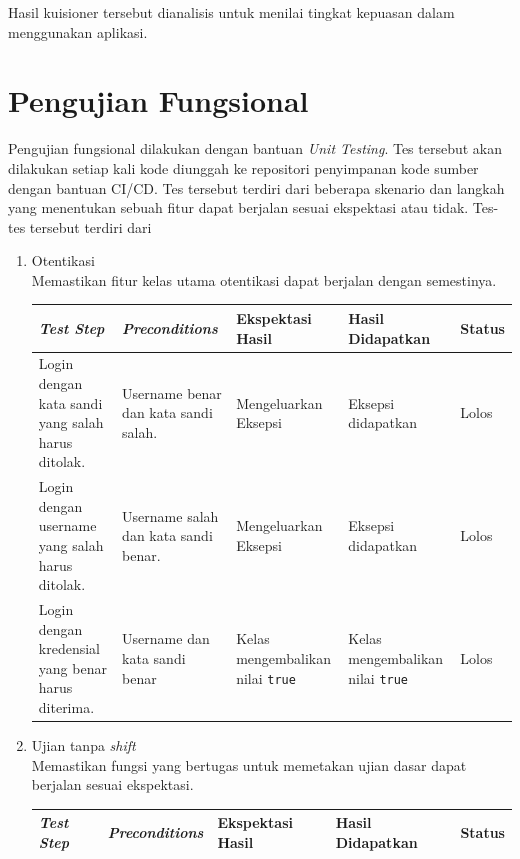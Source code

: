     Hasil kuisioner tersebut dianalisis untuk menilai tingkat kepuasan dalam menggunakan aplikasi.

\section{Pengujian Fungsional}
Pengujian fungsional dilakukan dengan bantuan \textit{Unit Testing}. Tes tersebut akan dilakukan
setiap kali kode diunggah ke repositori penyimpanan kode sumber dengan bantuan CI/CD. Tes tersebut
terdiri dari beberapa skenario dan langkah yang menentukan sebuah fitur dapat berjalan sesuai ekspektasi
atau tidak. Tes-tes tersebut terdiri dari
\begin{enumerate}
    \item Otentikasi\\
        Memastikan fitur kelas utama otentikasi dapat berjalan dengan semestinya.\\
        \begin{tabularx}{0.9\textwidth}{|X|X|X|X|X|}
            \hline
            \textit{Test Step} & \textit{Preconditions} & Ekspektasi Hasil & Hasil Didapatkan & Status  \\
            \hline
            Login dengan kata sandi yang salah harus ditolak. & Username benar dan kata sandi salah. & Mengeluarkan Eksepsi & Eksepsi didapatkan & Lolos \\
            \hline
            Login dengan username yang salah harus ditolak. & Username salah dan kata sandi benar. & Mengeluarkan Eksepsi & Eksepsi didapatkan & Lolos \\
            \hline
            Login dengan kredensial yang benar harus diterima. & Username dan kata sandi benar & Kelas mengembalikan nilai \texttt{true} & Kelas mengembalikan nilai \texttt{true} & Lolos \\
            \hline
        \end{tabularx}
        
    \item Ujian tanpa \textit{shift}\\
        Memastikan fungsi yang bertugas untuk memetakan ujian dasar dapat berjalan sesuai ekspektasi.\\
         \begin{tabularx}{0.9\textwidth}{|X|X|X|X|X|}
            \hline
            \textit{Test Step} & \textit{Preconditions} & Ekspektasi Hasil & Hasil Didapatkan & Status  \\
            \hline
            

\end{tabularx}
\end{enumerate}
